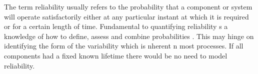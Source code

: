 
The term reliability usually refers to the probability that a
component or system will operate satisfactorily either at any particular
instant at which it is required or for a certain length of
time. Fundamental to quantifying reliability s a knowledge of how to
define, assess and combine probabilities \cite{Bontempi2005Adaptive}. This may hinge on identifying the
form of the variability which is nherent n most processes. If all
components had a fixed known lifetime there would be no need to model
reliability.

